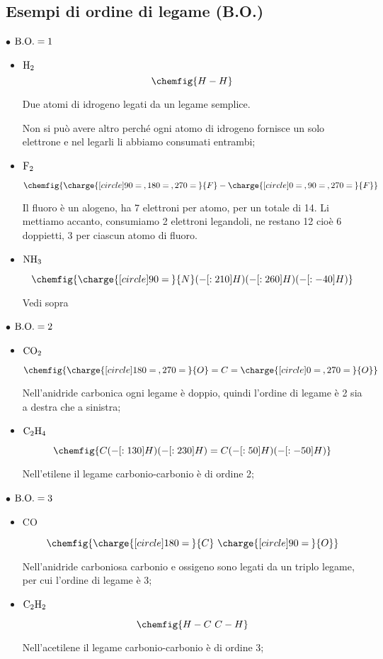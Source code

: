 \subsection{Esempi di ordine di legame (B.O.)}
$\bullet$ $\rm B.O.=1$
\begin{itemize}
    \item $\rm H_2$
    $$
    \chemfig{H-H}
    $$

    Due atomi di idrogeno legati da un legame semplice.
    
    Non si può avere altro perché ogni atomo di idrogeno fornisce un solo elettrone e nel legarli li abbiamo consumati entrambi;
    \item $\rm F_2$
    
    $$
    \chemfig{\charge{[circle]90=\:,180=\:,270=\:}{F}-\charge{[circle]0=\:,90=\:,270=\:}{F}}
    $$

    Il fluoro è un alogeno, ha 7 elettroni per atomo, per un totale di 14. Li mettiamo accanto, consumiamo 2 elettroni legandoli, ne restano 12 cioè 6 doppietti, 3 per ciascun atomo di fluoro.
    \item $\rm NH_3$
    
    $$
    \chemfig{\charge{[circle]90=\:}{N}(-[:210]H)(-[:260]H)(-[:-40]H)}
    $$

    Vedi sopra
\end{itemize}

$\bullet$ $\rm B.O.=2$
\begin{itemize}
    \item $\rm CO_2$
    
    $$
    \chemfig{\charge{[circle]180=\:,270=\:}{O}=C=\charge{[circle]0=\:,270=\:}{O}}
    $$

    Nell'anidride carbonica ogni legame è doppio, quindi l'ordine di legame è 2 sia a destra che a sinistra;
    \item $\rm C_2H_4$
    
    $$
    \chemfig{C(-[:130]H)(-[:230]H)=C(-[:50]H)(-[:-50]H)}
    $$

    Nell'etilene il legame carbonio-carbonio è di ordine 2;
 \end{itemize}

$\bullet$ $\rm B.O.=3$
\begin{itemize}
    \item CO
    
    $$
    \chemfig{\charge{[circle]180=\:}{C}~\charge{[circle]90=\:}{O}}
    $$

    Nell'anidride carboniosa carbonio e ossigeno sono legati da un triplo legame, per cui l'ordine di legame è 3;
    \item $\rm C_2H_2$
    
    $$
    \chemfig{H-C~C-H}
    $$

    Nell'acetilene il legame carbonio-carbonio è di ordine 3;
\end{itemize}

